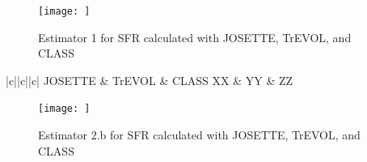 \begin{figure}[h]
	\begin{center}
		\texttt{[image: ]}
		\caption{Estimator 1 for SFR calculated with JOSETTE, TrEVOL, and CLASS}
		\label{fig:Est1_SFR}
	\end{center}
\end{figure}

\begin{table}[h]
	\begin{center}
		\begin{tabular}{|c||c||c|}
			\hline 
				JOSETTE & TrEVOL & CLASS
			\hline
				XX & YY & ZZ 
		\end{tabular}
	\end{center}
	\label{table:Est1Dev_SFR}
\end{table}

\begin{figure}[h]
	\begin{center}
		\texttt{[image: ]}
		\caption{Estimator 2.b for SFR calculated with JOSETTE, TrEVOL, and CLASS}
		\label{fig:Est2_SFR}
	\end{center}
\end{figure}
